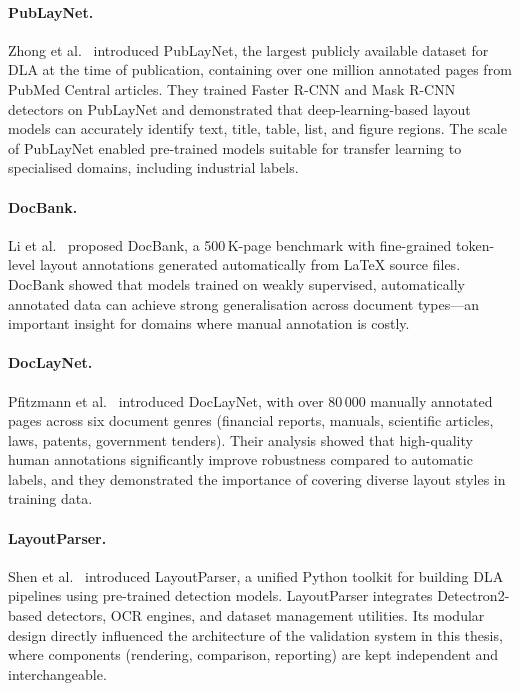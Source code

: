 \paragraph{PubLayNet.}
Zhong et al.~\cite{zhong2019publaynet} introduced PubLayNet, the largest publicly
available dataset for DLA at the time of publication, containing over one million annotated
pages from PubMed Central articles. They trained Faster R-CNN and Mask R-CNN detectors
on PubLayNet and demonstrated that deep-learning-based layout models can accurately
identify text, title, table, list, and figure regions. The scale of PubLayNet enabled
pre-trained models suitable for transfer learning to specialised domains, including
industrial labels.

\paragraph{DocBank.}
Li et al.~\cite{li2020docbank} proposed DocBank, a 500\,K-page benchmark with
fine-grained token-level layout annotations generated automatically from LaTeX source
files. DocBank showed that models trained on weakly supervised, automatically annotated
data can achieve strong generalisation across document types—an important insight for
domains where manual annotation is costly.

\paragraph{DocLayNet.}
Pfitzmann et al.~\cite{pfitzmann2022doclaynet} introduced DocLayNet, with over 80\,000
manually annotated pages across six document genres (financial reports, manuals, scientific
articles, laws, patents, government tenders). Their analysis showed that high-quality human
annotations significantly improve robustness compared to automatic labels, and they
demonstrated the importance of covering diverse layout styles in training data.

\paragraph{LayoutParser.}
Shen et al.~\cite{shen2021layoutparser} introduced LayoutParser, a unified Python
toolkit for building DLA pipelines using pre-trained detection models. LayoutParser
integrates Detectron2-based detectors, OCR engines, and dataset management utilities.
Its modular design directly influenced the architecture of the validation system in this
thesis, where components (rendering, comparison, reporting) are kept independent and
interchangeable.


